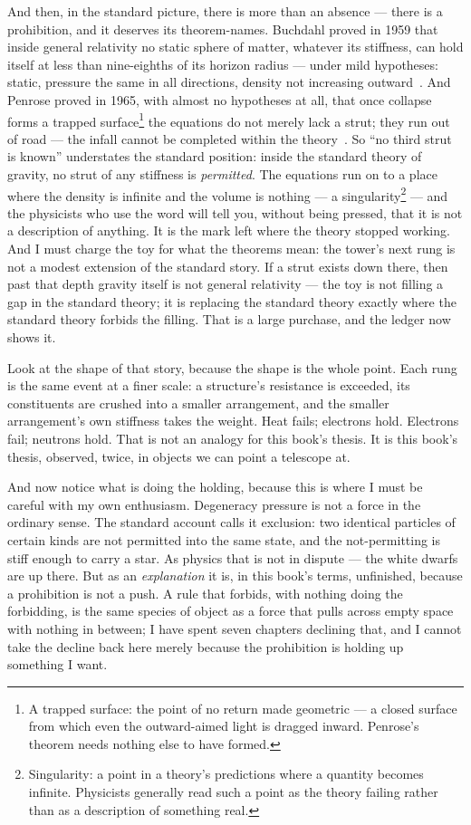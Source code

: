 \documentclass[fontsize=11pt,paper=a4,pagesize=auto,parskip=half-]{scrbook}
\begin{document}
And then, in the standard picture, there is more than an absence --- there is a prohibition, and it deserves its theorem-names. Buchdahl proved in 1959 that inside general relativity no static sphere of matter, whatever its stiffness, can hold itself at less than nine-eighths of its horizon radius --- under mild hypotheses: static, pressure the same in all directions, density not increasing outward~\cite{buchdahl1959}. And Penrose proved in 1965, with almost no hypotheses at all, that once collapse forms a trapped surface\footnote{A trapped surface: the point of no return made geometric --- a closed surface from which even the outward-aimed light is dragged inward. Penrose's theorem needs nothing else to have formed.} the equations do not merely lack a strut; they run out of road --- the infall cannot be completed within the theory~\cite{penrose1965}. So ``no third strut is known'' understates the standard position: inside the standard theory of gravity, no strut of any stiffness is \emph{permitted}. The equations run on to a place where the density is infinite and the volume is nothing --- a singularity\footnote{Singularity: a point in a theory's predictions where a quantity becomes infinite. Physicists generally read such a point as the theory failing rather than as a description of something real.} --- and the physicists who use the word will tell you, without being pressed, that it is not a description of anything. It is the mark left where the theory stopped working. And I must charge the toy for what the theorems mean: the tower's next rung is not a modest extension of the standard story. If a strut exists down there, then past that depth gravity itself is not general relativity --- the toy is not filling a gap in the standard theory; it is replacing the standard theory exactly where the standard theory forbids the filling. That is a large purchase, and the ledger now shows it.

Look at the shape of that story, because the shape is the whole point. Each rung is the same event at a finer scale: a structure's resistance is exceeded, its constituents are crushed into a smaller arrangement, and the smaller arrangement's own stiffness takes the weight. Heat fails; electrons hold. Electrons fail; neutrons hold. That is not an analogy for this book's thesis. It is this book's thesis, observed, twice, in objects we can point a telescope at.

And now notice what is doing the holding, because this is where I must be careful with my own enthusiasm. Degeneracy pressure is not a force in the ordinary sense. The standard account calls it exclusion: two identical particles of certain kinds are not permitted into the same state, and the not-permitting is stiff enough to carry a star. As physics that is not in dispute --- the white dwarfs are up there. But as an \emph{explanation} it is, in this book's terms, unfinished, because a prohibition is not a push. A rule that forbids, with nothing doing the forbidding, is the same species of object as a force that pulls across empty space with nothing in between; I have spent seven chapters declining that, and I cannot take the decline back here merely because the prohibition is holding up something I want.
\end{document}
